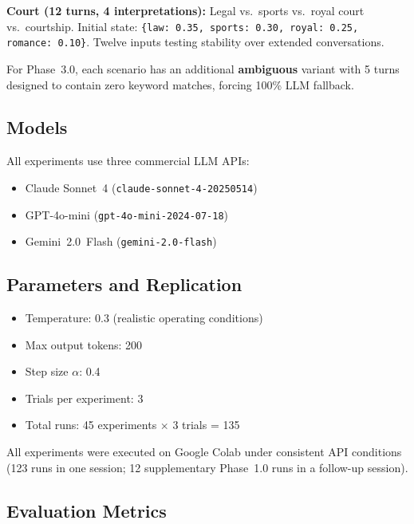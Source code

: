 \documentclass[11pt,a4paper]{article}
\begin{document}
\textbf{Court (12 turns, 4 interpretations):}
Legal vs.\ sports vs.\ royal court vs.\ courtship. Initial state:
\texttt{\{law: 0.35, sports: 0.30, royal: 0.25, romance: 0.10\}}. Twelve inputs
testing stability over extended conversations.

For Phase~3.0, each scenario has an additional \textbf{ambiguous} variant with
5 turns designed to contain zero keyword matches, forcing 100\% LLM fallback.

\subsection{Models}

All experiments use three commercial LLM APIs:
\begin{itemize}
    \item Claude Sonnet~4 (\texttt{claude-sonnet-4-20250514})
    \item GPT-4o-mini (\texttt{gpt-4o-mini-2024-07-18})
    \item Gemini~2.0~Flash (\texttt{gemini-2.0-flash})
\end{itemize}

\subsection{Parameters and Replication}

\begin{itemize}
    \item Temperature: 0.3 (realistic operating conditions)
    \item Max output tokens: 200
    \item Step size $\alpha$: 0.4
    \item Trials per experiment: 3
    \item Total runs: 45 experiments $\times$ 3 trials = 135
\end{itemize}

All experiments were executed on Google Colab under consistent API conditions
(123 runs in one session; 12 supplementary Phase~1.0 runs in a follow-up session).

\subsection{Evaluation Metrics}
\end{document}
